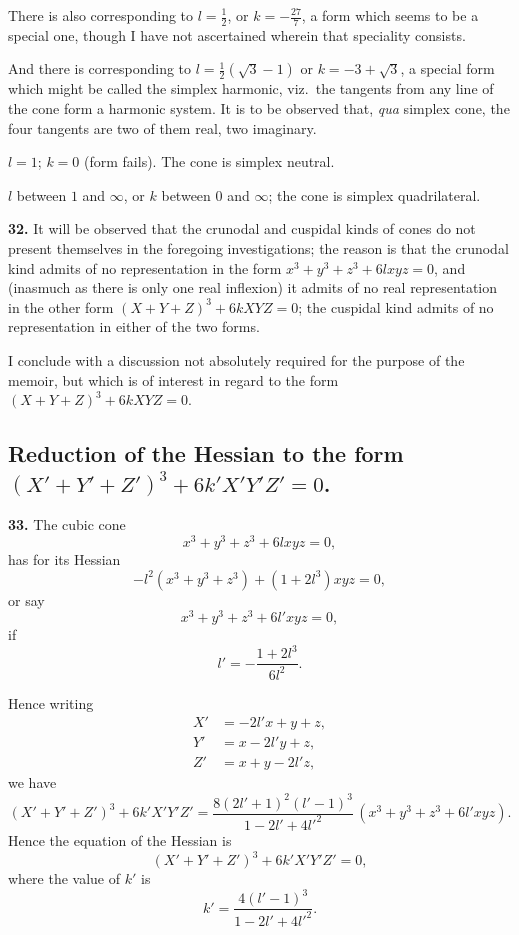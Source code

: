 \documentclass[11pt,a4paper]{article}
\begin{document}
There is also corresponding to $l = \tfrac{1}{2}$, or $k = -\tfrac{27}{7}$, a form which seems to be a special one, though I have not ascertained wherein that speciality consists.

And there is corresponding to $l = \tfrac{1}{2}(\sqrt{3} - 1)$ or $k = -3 + \sqrt{3}$, a special form which might be called the simplex harmonic, viz.\ the tangents from any line of the cone form a harmonic system. It is to be observed that, \textit{qua} simplex cone, the four tangents are two of them real, two imaginary.

$l = 1$; $k = 0$ (form fails). The cone is simplex neutral.

$l$ between $1$ and $\infty$, or $k$ between $0$ and $\infty$; the cone is simplex quadrilateral.

\textbf{32.} It will be observed that the crunodal and cuspidal kinds of cones do not present themselves in the foregoing investigations; the reason is that the crunodal kind admits of no representation in the form $x^{3} + y^{3} + z^{3} + 6lxyz = 0$, and (inasmuch as there is only one real inflexion) it admits of no real representation in the other form $(X + Y + Z)^{3} + 6kXYZ = 0$; the cuspidal kind admits of no representation in either of the two forms.

I conclude with a discussion not absolutely required for the purpose of the memoir, but which is of interest in regard to the form $(X + Y + Z)^{3} + 6kXYZ = 0$.

\subsection*{Reduction of the Hessian to the form $(X' + Y' + Z')^{3} + 6k'X'Y'Z' = 0$.}

\textbf{33.} The cubic cone
\[
x^{3} + y^{3} + z^{3} + 6lxyz = 0,
\]
has for its Hessian
\[
-l^{2}(x^{3} + y^{3} + z^{3}) + (1 + 2l^{3})xyz = 0,
\]
or say
\[
x^{3} + y^{3} + z^{3} + 6l'xyz = 0,
\]
if
\[
l' = -\frac{1 + 2l^{3}}{6l^{2}}.
\]

Hence writing
\[
\begin{aligned}
X' &= -2l'x + y + z,\\
Y' &= x - 2l'y + z,\\
Z' &= x + y - 2l'z,
\end{aligned}
\]
we have
\[
(X' + Y' + Z')^{3} + 6k'X'Y'Z' = \frac{8(2l' + 1)^{2}(l' - 1)^{3}}{1 - 2l' + 4l'^{2}}\,(x^{3} + y^{3} + z^{3} + 6l'xyz).
\]
Hence the equation of the Hessian is
\[
(X' + Y' + Z')^{3} + 6k'X'Y'Z' = 0,
\]
where the value of $k'$ is
\[
k' = \frac{4(l' - 1)^{3}}{1 - 2l' + 4l'^{2}}.
\]
\end{document}
